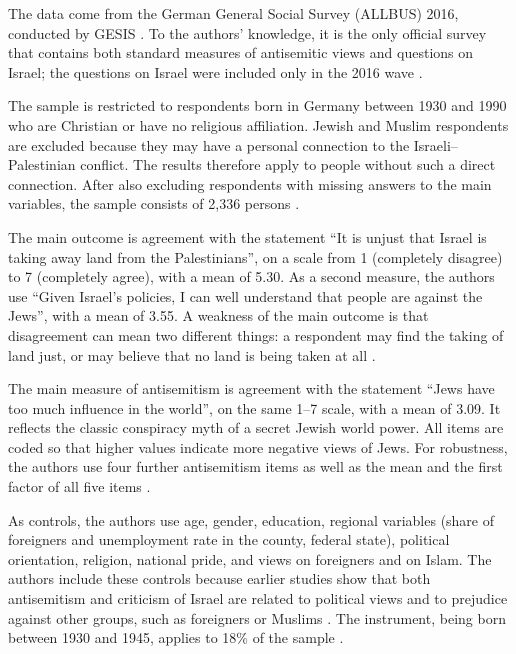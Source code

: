 The data come from the German General Social Survey (ALLBUS) 2016, conducted by GESIS \citep{allbus2016}. To the authors' knowledge, it is the only official survey that contains both standard measures of antisemitic views and questions on Israel; the questions on Israel were included only in the 2016 wave \citep[pp.~2333, 2345]{binstok2024}.

The sample is restricted to respondents born in Germany between 1930 and 1990 who are Christian or have no religious affiliation. Jewish and Muslim respondents are excluded because they may have a personal connection to the Israeli--Palestinian conflict.
The results therefore apply to people without such a direct connection. 
After also excluding respondents with missing answers to the main variables, the sample consists of 2,336 persons \citep[pp.~2345, 2347]{binstok2024}.

The main outcome is agreement with the statement ``It is unjust that Israel is taking away land from the Palestinians'', on a scale from 1 (completely disagree) to 7 (completely agree), with a mean of 5.30. As a second measure, the authors use ``Given Israel's policies, I can well understand that people are against the Jews'', with a mean of 3.55. A weakness of the main outcome is that disagreement can mean two different things: a respondent may find the taking of land just, or may believe that no land is being taken at all \citep[pp.~2345--2346]{binstok2024}.

The main measure of antisemitism is agreement with the statement ``Jews have too much influence in the world'', on the same 1--7 scale, with a mean of 3.09. It reflects the classic conspiracy myth of a secret Jewish world power.
All items are coded so that higher values indicate more negative views of Jews.
For robustness, the authors use four further antisemitism items as well as the mean and the first factor of all five items \citep[pp.~2348--2349]{binstok2024}.

As controls, the authors use age, gender, education, regional variables (share of foreigners and unemployment rate in the county, federal state), political orientation, religion, national pride, and views on foreigners and on Islam. The authors include these controls because earlier studies show that both antisemitism and criticism of Israel are related to political views and to prejudice against other groups, such as foreigners or Muslims \citep[p.~2352]{binstok2024}. The instrument, being born between 1930 and 1945, applies to 18\% of the sample \citep[p.~2347]{binstok2024}.